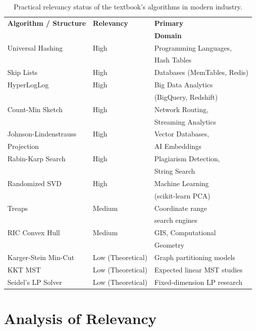 \documentclass[twoside,12pt]{book}
\theoremstyle{plain}
\theoremstyle{definition}
\theoremstyle{remark}
\begin{document}
\begin{table}[h]
\centering
\begin{tabular}{|l|l|l|}
\hline
\textbf{Algorithm / Structure} & \textbf{Relevancy} & \textbf{Primary} \\
 & & \textbf{Domain} \\ \hline
Universal Hashing & High & Programming Languages, \\
 & & Hash Tables \\ \hline
Skip Lists & High & Databases (MemTables, Redis) \\ \hline
HyperLogLog & High & Big Data Analytics \\
 & & (BigQuery, Redshift) \\ \hline
Count-Min Sketch & High & Network Routing, \\
 & & Streaming Analytics \\ \hline
Johnson-Lindenstrauss & High & Vector Databases, \\
Projection & & AI Embeddings \\ \hline
Rabin-Karp Search & High & Plagiarism Detection, \\
 & & String Search \\ \hline
Randomized SVD & High & Machine Learning \\
 & & (scikit-learn PCA) \\ \hline
Treaps & Medium & Coordinate range \\
 & & search engines \\ \hline
RIC Convex Hull & Medium & GIS, Computational \\
 & & Geometry \\ \hline
Karger-Stein Min-Cut & Low (Theoretical) & Graph partitioning models \\ \hline
KKT MST & Low (Theoretical) & Expected linear MST studies \\ \hline
Seidel's LP Solver & Low (Theoretical) & Fixed-dimension LP research \\ \hline
\end{tabular}
\caption{Practical relevancy status of the textbook's algorithms in modern industry.}
\label{tab:relevancy-matrix}
\end{table}

\section{Analysis of Relevancy}
\end{document}
